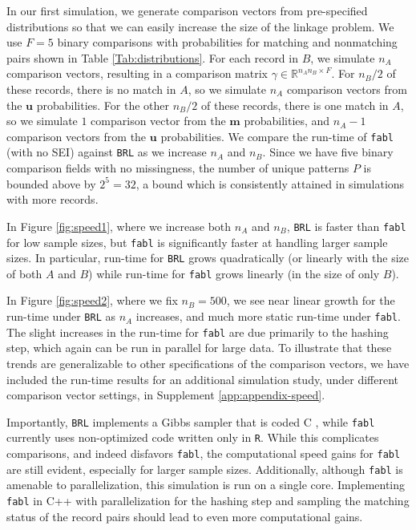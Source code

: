 \documentclass[ba]{imsart}
\begin{document}
	In our first simulation, we generate comparison vectors from pre-specified distributions so that we can easily increase the size of the linkage problem. We use $F = 5$ binary comparisons with probabilities for matching and nonmatching pairs shown in Table \ref{Tab:distributions}. For each record in $B$, we simulate $n_A$ comparison vectors, resulting in a comparison matrix $\gamma \in \mathbb{R}^{n_A n_B \times F}$. For $n_B/2$ of these records, there is no match in $A$, so we simulate $n_A$ comparison vectors from the $\bm{u}$ probabilities. For the other $n_B/2$ of these records, there is one match in $A$, so we simulate $1$ comparison vector from the $\bm{m}$ probabilities, and $n_A - 1$ comparison vectors from the $\bm{u}$ probabilities. We compare the run-time of \texttt{fabl} (with no SEI) against \texttt{BRL} as we increase $n_A$ and $n_B$. Since we have five binary comparison fields with no missingness, the number of unique patterns $P$ is bounded above by $2^5 = 32$, a bound which is consistently attained in simulations with more records.
	
	In Figure \ref{fig:speed1}, where we increase both $n_A$ and $n_B$, \texttt{BRL} is faster than \texttt{fabl} for low sample sizes, but \texttt{fabl} is significantly faster at handling larger sample sizes. In particular, run-time for \texttt{BRL} grows quadratically (or linearly with the size of both $A$ and $B$) while run-time for \texttt{fabl} grows linearly (in the size of only $B$).
	
	In Figure \ref{fig:speed2}, where we fix $n_B = 500$, we see near linear growth for the run-time under \texttt{BRL} as $n_A$ increases, and much more static run-time under \texttt{fabl}. The slight increases in the run-time for \texttt{fabl} are due primarily to the hashing step, which again can be run in parallel for large data. To illustrate that these trends are generalizable to other specifications of the comparison vectors, we have included the run-time results for an additional simulation study, under different comparison vector settings, in Supplement \ref{app:appendix-speed}.
	
	Importantly, \texttt{BRL} implements a Gibbs sampler that is coded C \citep{sadinle_bayesian_2017}, while \texttt{fabl} currently uses non-optimized code written only in \texttt{R}.  While this complicates comparisons, and indeed disfavors \texttt{fabl}, the computational speed gains for \texttt{fabl} are still evident, especially for larger sample sizes.  Additionally, although \texttt{fabl} is amenable to parallelization, this simulation is run on a single core. Implementing \texttt{fabl} in C++ with parallelization for the hashing step and sampling the matching status of the record pairs should lead to even more computational gains.
\end{document}
